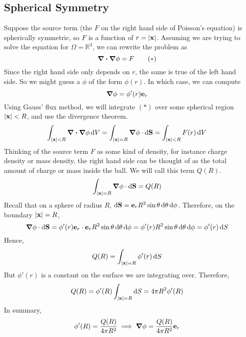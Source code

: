 \subsection{Spherical Symmetry}
Suppose the source term (the $F$ on the right hand side of Poisson's equation) is spherically symmetric, so $F$ is a function of $r = \abs{\vb x}$. Assuming we are trying to solve the equation for $\Omega = \mathbb R^3$, we can rewrite the problem as
\begin{equation}
	\div{\grad{\phi}} = F
	\tag{$\ast$}
\end{equation}
Since the right hand side only depends on $r$, the same is true of the left hand side. So we might guess a $\phi$ of the form $\phi(r)$. In which case, we can compute
\[ \grad{\phi} = \phi'(r) \vb e_r \]
Using Gauss' flux method, we will integrate $(\ast)$ over some spherical region $\abs{\vb x} < R$, and use the divergence theorem.
\[ \int_{\abs{\vb x} < R} \div{\grad{\phi}}\dd{V} = \int_{\abs{\vb x} = R} \grad{\phi} \cdot \dd{\vb S} = \int_{\abs{\vb x} < R} F(r) \dd{V} \]
Thinking of the source term $F$ as some kind of density, for instance charge density or mass density, the right hand side can be thought of as the total amount of charge or mass inside the ball. We will call this term $Q(R)$.
\[ \int_{\abs{\vb x} = R} \grad{\phi} \cdot \dd{\vb S} = Q(R) \]
Recall that on a sphere of radius $R$, $\dd{\vb S} = \vb e_r R^2 \sin\theta \dd{\theta}\dd{\phi}$. Therefore, on the boundary $\abs{\vb x} = R$,
\[ \grad{\phi} \cdot \dd{\vb S} = \phi'(r) \vb e_r \cdot \vb e_r R^2 \sin\theta \dd{\theta}\dd{\phi} = \phi'(r) R^2 \sin\theta \dd{\theta}\dd{\phi} = \phi'(r) \dd{S} \]
Hence,
\[ Q(R) = \int_{\abs{\vb x} = R} \phi'(r) \dd{S} \]
But $\phi'(r)$ is a constant on the surface we are integrating over. Therefore,
\[ Q(R) = \phi'(R) \int_{\abs{\vb x} = R} \dd{S} = 4\pi R^2 \phi'(R) \]
In summary,
\[ \phi'(R) = \frac{Q(R)}{4\pi R^2} \implies \grad{\phi} = \frac{Q(R)}{4\pi R^2} \vb e_r \]

